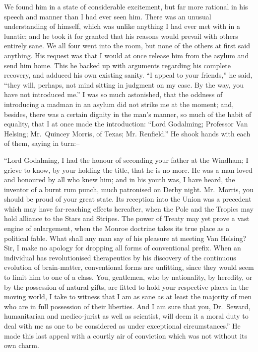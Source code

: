\documentclass[12pt,openright]{book}
\begin{document}
We found him in a state of considerable excitement, but far more rational in his speech and manner than I had ever seen him. There was an unusual understanding of himself, which was unlike anything I had ever met with in a lunatic; and he took it for granted that his reasons would prevail with others entirely sane. We all four went into the room, but none of the others at first said anything. His request was that I would at once release him from the asylum and send him home. This he backed up with arguments regarding his complete recovery, and adduced his own existing sanity. “I appeal to your friends,” he said, “they will, perhaps, not mind sitting in judgment on my case. By the way, you have not introduced me.” I was so much astonished, that the oddness of introducing a madman in an asylum did not strike me at the moment; and, besides, there was a certain dignity in the man’s manner, so much of the habit of equality, that I at once made the introduction: “Lord Godalming; Professor Van Helsing; Mr. Quincey Morris, of Texas; Mr. Renfield.” He shook hands with each of them, saying in turn:–

“Lord Godalming, I had the honour of seconding your father at the Windham; I grieve to know, by your holding the title, that he is no more. He was a man loved and honoured by all who knew him; and in his youth was, I have heard, the inventor of a burnt rum punch, much patronised on Derby night. Mr. Morris, you should be proud of your great state. Its reception into the Union was a precedent which may have far-reaching effects hereafter, when the Pole and the Tropics may hold alliance to the Stars and Stripes. The power of Treaty may yet prove a vast engine of enlargement, when the Monroe doctrine takes its true place as a political fable. What shall any man say of his pleasure at meeting Van Helsing? Sir, I make no apology for dropping all forms of conventional prefix. When an individual has revolutionised therapeutics by his discovery of the continuous evolution of brain-matter, conventional forms are unfitting, since they would seem to limit him to one of a class. You, gentlemen, who by nationality, by heredity, or by the possession of natural gifts, are fitted to hold your respective places in the moving world, I take to witness that I am as sane as at least the majority of men who are in full possession of their liberties. And I am sure that you, Dr. Seward, humanitarian and medico-jurist as well as scientist, will deem it a moral duty to deal with me as one to be considered as under exceptional circumstances.” He made this last appeal with a courtly air of conviction which was not without its own charm.
\end{document}
